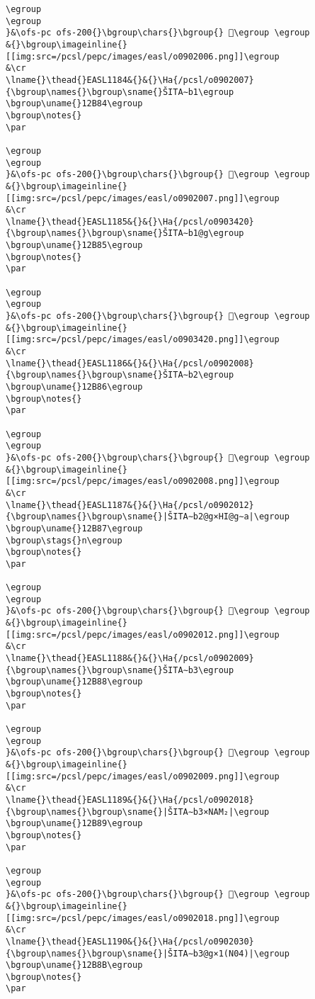 \begin{verbatim}
\egroup
\egroup
}&\ofs-pc ofs-200{}\bgroup\chars{}\bgroup{} 𒮃\egroup \egroup
&{}\bgroup\imageinline{}[[img:src=/pcsl/pepc/images/easl/o0902006.png]]\egroup
&\cr
\lname{}\thead{}EASL1184&{}&{}\Ha{/pcsl/o0902007}{\bgroup\names{}\bgroup\sname{}ŠITA∼b1\egroup
\bgroup\uname{}12B84\egroup
\bgroup\notes{}
\par 

\egroup
\egroup
}&\ofs-pc ofs-200{}\bgroup\chars{}\bgroup{} 𒮄\egroup \egroup
&{}\bgroup\imageinline{}[[img:src=/pcsl/pepc/images/easl/o0902007.png]]\egroup
&\cr
\lname{}\thead{}EASL1185&{}&{}\Ha{/pcsl/o0903420}{\bgroup\names{}\bgroup\sname{}ŠITA∼b1@g\egroup
\bgroup\uname{}12B85\egroup
\bgroup\notes{}
\par 

\egroup
\egroup
}&\ofs-pc ofs-200{}\bgroup\chars{}\bgroup{} 𒮅\egroup \egroup
&{}\bgroup\imageinline{}[[img:src=/pcsl/pepc/images/easl/o0903420.png]]\egroup
&\cr
\lname{}\thead{}EASL1186&{}&{}\Ha{/pcsl/o0902008}{\bgroup\names{}\bgroup\sname{}ŠITA∼b2\egroup
\bgroup\uname{}12B86\egroup
\bgroup\notes{}
\par 

\egroup
\egroup
}&\ofs-pc ofs-200{}\bgroup\chars{}\bgroup{} 𒮆\egroup \egroup
&{}\bgroup\imageinline{}[[img:src=/pcsl/pepc/images/easl/o0902008.png]]\egroup
&\cr
\lname{}\thead{}EASL1187&{}&{}\Ha{/pcsl/o0902012}{\bgroup\names{}\bgroup\sname{}|ŠITA∼b2@g×HI@g∼a|\egroup
\bgroup\uname{}12B87\egroup
\bgroup\stags{}n\egroup
\bgroup\notes{}
\par 

\egroup
\egroup
}&\ofs-pc ofs-200{}\bgroup\chars{}\bgroup{} 𒮇\egroup \egroup
&{}\bgroup\imageinline{}[[img:src=/pcsl/pepc/images/easl/o0902012.png]]\egroup
&\cr
\lname{}\thead{}EASL1188&{}&{}\Ha{/pcsl/o0902009}{\bgroup\names{}\bgroup\sname{}ŠITA∼b3\egroup
\bgroup\uname{}12B88\egroup
\bgroup\notes{}
\par 

\egroup
\egroup
}&\ofs-pc ofs-200{}\bgroup\chars{}\bgroup{} 𒮈\egroup \egroup
&{}\bgroup\imageinline{}[[img:src=/pcsl/pepc/images/easl/o0902009.png]]\egroup
&\cr
\lname{}\thead{}EASL1189&{}&{}\Ha{/pcsl/o0902018}{\bgroup\names{}\bgroup\sname{}|ŠITA∼b3×NAM₂|\egroup
\bgroup\uname{}12B89\egroup
\bgroup\notes{}
\par 

\egroup
\egroup
}&\ofs-pc ofs-200{}\bgroup\chars{}\bgroup{} 𒮉\egroup \egroup
&{}\bgroup\imageinline{}[[img:src=/pcsl/pepc/images/easl/o0902018.png]]\egroup
&\cr
\lname{}\thead{}EASL1190&{}&{}\Ha{/pcsl/o0902030}{\bgroup\names{}\bgroup\sname{}|ŠITA∼b3@g×1(N04)|\egroup
\bgroup\uname{}12B8B\egroup
\bgroup\notes{}
\par 


\end{verbatim}
